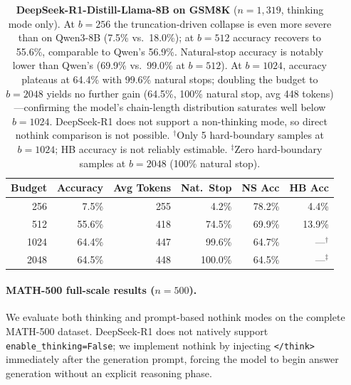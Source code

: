 \begin{table}[ht]
\centering
\small
\caption{\textbf{DeepSeek-R1-Distill-Llama-8B on GSM8K} ($n{=}1{,}319$, thinking mode only).
At $b{=}256$ the truncation-driven collapse is even more severe than on Qwen3-8B
(7.5\% vs.\ 18.0\%); at $b{=}512$ accuracy recovers to 55.6\%, comparable to Qwen's 56.9\%.
Natural-stop accuracy is notably lower than Qwen's (69.9\% vs.\ 99.0\% at $b{=}512$).
At $b{=}1024$, accuracy plateaus at 64.4\% with 99.6\% natural stops; doubling the budget to $b{=}2048$ yields no further gain (64.5\%, 100\% natural stop, avg 448 tokens)---confirming the model's chain-length distribution saturates well below $b{=}1024$.
DeepSeek-R1 does not support a non-thinking mode, so direct nothink comparison is not possible.
$^{\dagger}$Only 5 hard-boundary samples at $b{=}1024$; HB accuracy is not reliably estimable.
$^{\ddagger}$Zero hard-boundary samples at $b{=}2048$ (100\% natural stop).}
\label{tab:deepseek-gsm8k}
\begin{tabular}{rrrrrr}
\toprule
\textbf{Budget} & \textbf{Accuracy} & \textbf{Avg Tokens} & \textbf{Nat.\ Stop} & \textbf{NS Acc} & \textbf{HB Acc} \\
\midrule
256  & 7.5\%  & 255 & 4.2\%  & 78.2\% & 4.4\% \\
512  & 55.6\% & 418 & 74.5\% & 69.9\% & 13.9\% \\
1024 & 64.4\% & 447 & 99.6\% & 64.7\% & ---$^{\dagger}$ \\
2048 & 64.5\% & 448 & 100.0\% & 64.5\% & ---$^{\ddagger}$ \\
\bottomrule
\end{tabular}
\end{table}

\paragraph{MATH-500 full-scale results ($n{=}500$).}
We evaluate both thinking and prompt-based nothink modes on the complete MATH-500 dataset.
DeepSeek-R1 does not natively support \texttt{enable\_thinking=False}; we implement nothink
by injecting \texttt{</think>} immediately after the generation prompt, forcing the model
to begin answer generation without an explicit reasoning phase.

